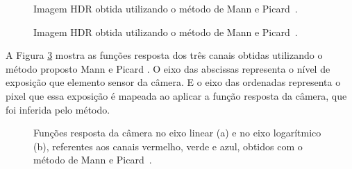 \begin{figure}[H]
  \centering
  \quad %
  \caption{Imagem HDR obtida utilizando o método de Mann e Picard~\protect\cite{mann}.}
  \label{figMann2}
\end{figure}

\begin{figure}[H]
  \centering
  \quad %
  \caption{Imagem HDR obtida utilizando o método de Mann e Picard~\protect\cite{mann}.}
  \label{figMann3}
\end{figure}

A Figura \ref{figMannFR} mostra as funções resposta dos três canais obtidas utilizando o método proposto Mann e Picard \cite{mann}. O eixo das abscissas representa o nível de exposição que elemento sensor da câmera. E o eixo das ordenadas representa o pixel que essa exposição é mapeada ao aplicar a função resposta da câmera, que foi inferida pelo método.

\begin{figure}[H]
  \centering
  \quad %
  \caption{Funções resposta da câmera no eixo linear (a) e no eixo logarítmico (b), referentes aos canais vermelho, verde e azul, obtidos com o método de Mann e Picard~\protect\cite{mann}.}
  \label{figMannFR}
\end{figure}